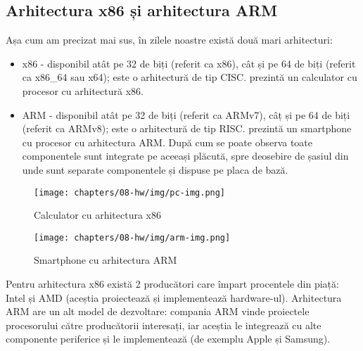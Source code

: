 \subsection{Arhitectura x86 și arhitectura ARM}
\label{sec:hw:class:x86-arm}

Așa cum am precizat mai sus, în zilele noastre există două mari arhitecturi:

\begin{itemize}
  \item x86 - disponibil atât pe 32 de biți (referit ca x86), cât și pe 64
          de biți (referit ca x86\_64 sau x64); este o arhitectură de tip
          CISC.  prezintă un calculator cu procesor cu arhitectură x86.

  \item ARM - disponibil atât pe 32 de biți (referit ca ARMv7), câț și pe
          64 de biți (referit ca ARMv8); este o arhitectură de tip RISC.
           prezintă un smartphone cu procesor cu arhitectura
          ARM. După cum se poate observa toate componentele sunt integrate
          pe aceeași plăcută, spre deosebire de șasiul din  unde sunt separate componentele și dispuse pe placa de bază.
\end{itemize}

\begin{figure}[!htbp]
  \centering
  \texttt{[image: chapters/08-hw/img/pc-img.png]}
  \caption{Calculator cu arhitectura x86\protect\footnotemark}
  \label{fig:hw:x86}
\end{figure}


\begin{figure}[!htbp]
  \centering
  \texttt{[image: chapters/08-hw/img/arm-img.png]}
  \caption{Smartphone cu arhitectura ARM\protect\footnotemark}
  \label{fig:hw:arm}
\end{figure}


Pentru arhitectura x86 există 2 producători care împart procentele din piață:
Intel și AMD (aceștia proiectează și implementează hardware-ul). Arhitectura ARM
are un alt model de dezvoltare: compania ARM vinde proiectele procesorului către
producătorii interesați, iar aceștia le integrează cu alte componente periferice
și le implementează (de exemplu Apple și Samsung).


